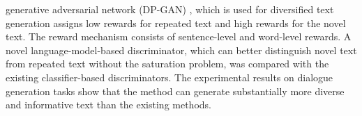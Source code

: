 generative adversarial network (DP-GAN) \cite{DP-GAN}, which is used for diversified text generation assigns low rewards for repeated text and high rewards for the novel text. The reward mechanism consists of sentence-level and word-level rewards. A novel language-model-based discriminator, which can better distinguish novel text from repeated text without the saturation problem, was compared with the existing classifier-based discriminators. The experimental results on dialogue generation tasks show that the method can generate substantially more diverse and informative text than the existing methods.